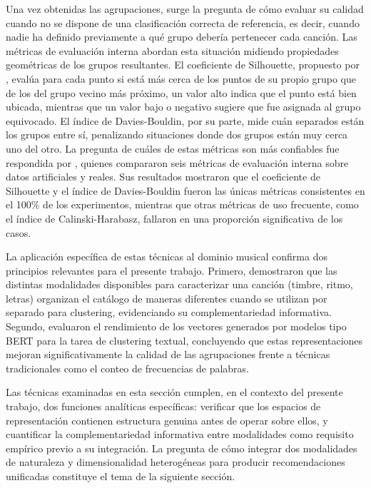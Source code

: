 Una vez obtenidas las agrupaciones, surge la pregunta de cómo evaluar su calidad cuando no se dispone de una clasificación correcta de referencia, es decir, cuando nadie ha definido previamente a qué grupo debería pertenecer cada canción. Las métricas de evaluación interna abordan esta situación midiendo propiedades geométricas de los grupos resultantes. El coeficiente de Silhouette, propuesto por \textcite{rousseeuw_1987_silhouettes}, evalúa para cada punto si está más cerca de los puntos de su propio grupo que de los del grupo vecino más próximo, un valor alto indica que el punto está bien ubicada, mientras que un valor bajo o negativo sugiere que fue asignada al grupo equivocado. El índice de Davies-Bouldin, por su parte, mide cuán separados están los grupos entre sí, penalizando situaciones donde dos grupos están muy cerca uno del otro. La pregunta de cuáles de estas métricas son más confiables fue respondida por \textcite{chicco_2025_silhouette_db}, quienes compararon seis métricas de evaluación interna sobre datos artificiales y reales. Sus resultados mostraron que el coeficiente de Silhouette y el índice de Davies-Bouldin fueron las únicas métricas consistentes en el 100\% de los experimentos, mientras que otras métricas de uso frecuente, como el índice de Calinski-Harabasz, fallaron en una proporción significativa de los casos.

La aplicación específica de estas técnicas al dominio musical confirma dos principios relevantes para el presente trabajo. Primero, \textcite{mayer_2008_music_clustering_features} demostraron que las distintas modalidades disponibles para caracterizar una canción (timbre, ritmo, letras) organizan el catálogo de maneras diferentes cuando se utilizan por separado para clustering, evidenciando su complementariedad informativa. Segundo, \textcite{lim_2022_bert_text_clustering} evaluaron el rendimiento de los vectores generados por modelos tipo BERT para la tarea de clustering textual, concluyendo que estas representaciones mejoran significativamente la calidad de las agrupaciones frente a técnicas tradicionales como el conteo de frecuencias de palabras.

Las técnicas examinadas en esta sección cumplen, en el contexto del presente trabajo, dos funciones analíticas específicas: verificar que los espacios de representación contienen estructura genuina antes de operar sobre ellos, y cuantificar la complementariedad informativa entre modalidades como requisito empírico previo a su integración. La pregunta de cómo integrar dos modalidades de naturaleza y dimensionalidad heterogéneas para producir recomendaciones unificadas constituye el tema de la siguiente sección.


